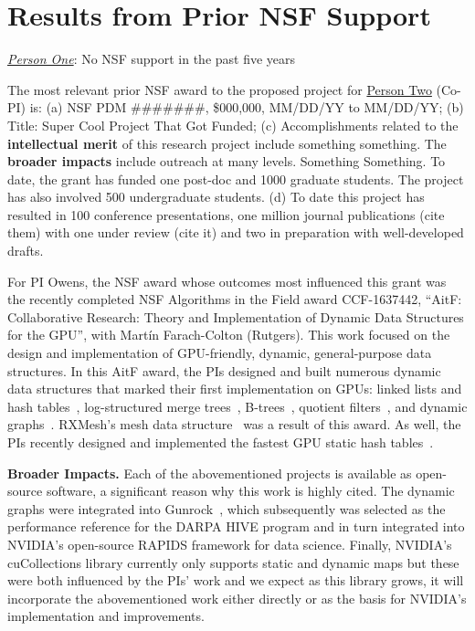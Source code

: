 \section{Results from Prior NSF Support}

\noindent \emph{\underline{Person One}}: No NSF support in the past five years \newline

\noindent The most relevant prior NSF award to the proposed project for
\underline{Person Two} (Co-PI) is: (a) NSF PDM \#\#\#\#\#\#\#, \$000,000,
MM/DD/YY to MM/DD/YY; (b) Title: Super Cool Project That Got Funded; (c)
Accomplishments related to the \textbf{intellectual merit} of this research project
include something something. The \textbf{broader impacts} include outreach at many
levels. Something Something. To date, the grant has funded one post-doc and 1000
graduate students. The project has also involved 500 undergraduate students. (d)
To date this project has resulted in 100 conference presentations, one million
journal publications (cite them) with one under review (cite it) and two in
preparation with well-developed drafts.

For PI Owens, the NSF award whose outcomes most influenced this grant was the recently completed NSF Algorithms in the Field award CCF-1637442, ``AitF: Collaborative Research: Theory and Implementation of Dynamic Data Structures for the GPU'', with Mart\'{i}n Farach-Colton (Rutgers). This work focused on the design and implementation of GPU-friendly, dynamic, general-purpose data structures.
 In this AitF award, the PIs designed and built numerous dynamic data structures that marked their first implementation on GPUs: linked lists and hash tables~\cite{Ashkiani:2018:ADH}, log-structured merge trees~\cite{Ashkiani:2018:GLA}, B-trees~\cite{Awad:2019:EAH}, quotient filters~\cite{Geil:2018:QFA}, and dynamic graphs~\cite{Awad:2020:DGO}. RXMesh's mesh data structure~\cite{Mahmoud:2021:RAG} was a result of this award. As well, the PIs recently designed and implemented the fastest GPU static hash tables~\cite{Awad:2023:AAI}.

\textbf{Broader Impacts.} Each of the abovementioned projects is available as open-source software, a significant reason why this work is highly cited. The dynamic graphs were integrated into Gunrock~\cite{Awad:2020:DGO,Wang:2017:GGG}, which subsequently was selected as the performance reference for the DARPA HIVE program and in turn integrated into NVIDIA's open-source RAPIDS framework for data science. Finally, NVIDIA's cuCollections library currently only supports static and dynamic maps but these were both influenced by the PIs' work and we expect as this library grows, it will incorporate the abovementioned work either directly or as the basis for NVIDIA's implementation and improvements.


